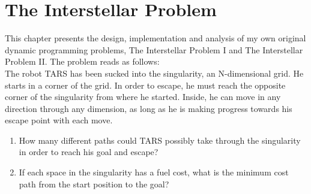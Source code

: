 \chapter{The Interstellar Problem}
This chapter presents the design, implementation and analysis of my own original dynamic programming problems, The Interstellar Problem I and The Interstellar Problem II.
The problem reads as follows:\\

The robot TARS has been sucked into the singularity, an N-dimensional grid. He starts in a corner of the grid. In order to escape, he must reach the opposite corner of the singularity from where he started.
Inside, he can move in any direction through any dimension, as long as he is making progress towards his escape point with each move.
\begin{enumerate}
    \item How many different paths could TARS possibly take through the singularity in order to reach his goal and escape?
    \item If each space in the singularity has a fuel cost, what is the minimum cost path from the start position to the goal?
\end{enumerate}


